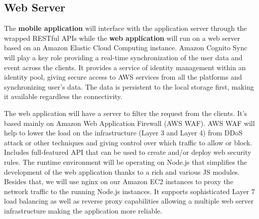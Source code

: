 \subsection*{Web Server}
The \textbf{mobile application} will interface with the application server through the wrapped RESTful APIs while the \textbf{web application} will run on a web server based on an Amazon Elastic Cloud Computing instance.
Amazon Cognito Sync will play a key role providing a real-time synchronization of the user data and event across the clients.
It provides a service of identity management within an identity pool, giving secure access to AWS services from all the platforms and synchronizing user's data. 
The data is persistent to the local storage first, making it available regardless the connectivity.

The web application will have a server to filter the request from the clients. 
It's based mainly on Amazon Web Application Firewall (AWS WAF).
AWS WAF will help to lower the load on the infrastructure (Layer 3 and Layer 4) from DDoS attack or other techniques and giving control over which traffic to allow or block. 
Includes full-featured API that can be used to create and/or deploy web security rules.
The runtime environment will be operating on Node.js that simplifies the development of the web application thanks to a rich and various JS modules. 
Besides that, we will use nginx on our Amazon EC2 instances to proxy the network traffic to the running Node.js instances.
It supports sophisticated Layer 7 load balancing as well as reverse proxy capabilities allowing a multiple web server infrastructure making the application more reliable.

